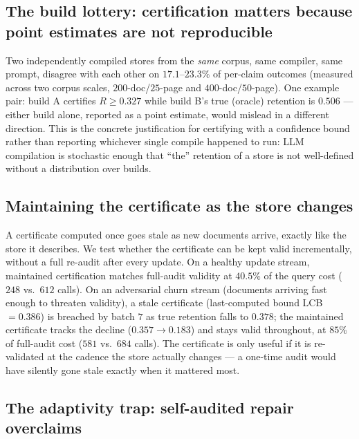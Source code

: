\subsection{The build lottery: certification matters because point estimates are not reproducible}
\label{sec:build-lottery}

Two independently compiled stores from the \emph{same} corpus, same compiler, same prompt, disagree with each other on $17.1$--$23.3\%$ of per-claim outcomes (measured across two corpus scales, $200$-doc/$25$-page and $400$-doc/$50$-page). One example pair: build A certifies $R \ge 0.327$ while build B's true (oracle) retention is $0.506$ --- either build alone, reported as a point estimate, would mislead in a different direction. This is the concrete justification for certifying with a confidence bound rather than reporting whichever single compile happened to run: LLM compilation is stochastic enough that ``the'' retention of a store is not well-defined without a distribution over builds.

\subsection{Maintaining the certificate as the store changes}

A certificate computed once goes stale as new documents arrive, exactly like the store it describes. We test whether the certificate can be kept valid incrementally, without a full re-audit after every update. On a healthy update stream, maintained certification matches full-audit validity at $40.5\%$ of the query cost ($248$ vs.\ $612$ calls). On an adversarial churn stream (documents arriving fast enough to threaten validity), a stale certificate (last-computed bound LCB $= 0.386$) is breached by batch $7$ as true retention falls to $0.378$; the maintained certificate tracks the decline ($0.357 \to 0.183$) and stays valid throughout, at $85\%$ of full-audit cost ($581$ vs.\ $684$ calls). The certificate is only useful if it is re-validated at the cadence the store actually changes --- a one-time audit would have silently gone stale exactly when it mattered most.

\subsection{The adaptivity trap: self-audited repair overclaims}

